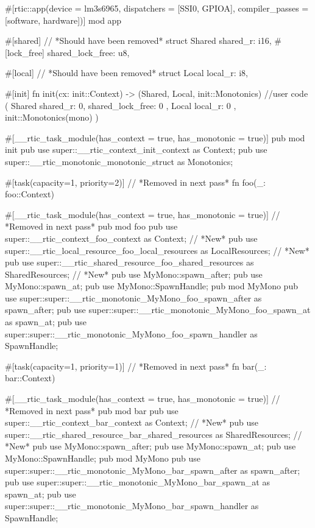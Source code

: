 #[rtic::app(device = lm3s6965, dispatchers = [SSI0, GPIOA], compiler_passes = [software, hardware])]
mod app {
    #[shared] // *Should have been removed*
    struct Shared {
        shared_r: i16,
        #[lock_free]
        shared_lock_free: u8,
    }

    #[local] // *Should have been removed*
    struct Local {
        local_r: i8,
    }

    #[init]
    fn init(cx: init::Context) -> (Shared, Local, init::Monotonics) {
        //user code
        (
            Shared { shared_r: 0, shared_lock_free: 0 }, 
            Local { local_r: 0 }, 
            init::Monotonics(mono)
        )
    }
    
    #[__rtic_task_module(has_context = true, has_monotonic = true)]
    pub mod init {
        pub use super::__rtic_context_init_context as Context;
        pub use super::__rtic_monotonic_monotonic_struct as Monotonics;
    }

    #[task(capacity=1, priority=2)] // *Removed in next pass*
    fn foo(_: foo::Context) {
    }
    
    #[__rtic_task_module(has_context = true, has_monotonic = true)] // *Removed in next pass*
    pub mod foo {
        pub use super::__rtic_context_foo_context as Context; // *New*
        pub use super::__rtic_local_resource_foo_local_resources as LocalResources; // *New*
        pub use super::__rtic_shared_resource_foo_shared_resources as SharedResources; // *New*
        pub use MyMono::spawn_after;
        pub use MyMono::spawn_at;
        pub use MyMono::SpawnHandle;
        pub mod MyMono {
            pub use super::super::__rtic_monotonic_MyMono_foo_spawn_after as spawn_after;
            pub use super::super::__rtic_monotonic_MyMono_foo_spawn_at as spawn_at;
            pub use super::super::__rtic_monotonic_MyMono_foo_spawn_handler as SpawnHandle;
        }
    }

    #[task(capacity=1, priority=1)] // *Removed in next pass*
    fn bar(_: bar::Context) {
    }
    
    #[__rtic_task_module(has_context = true, has_monotonic = true)] // *Removed in next pass*
    pub mod bar {
        pub use super::__rtic_context_bar_context as Context; // *New*
        pub use super::__rtic_shared_resource_bar_shared_resources as SharedResources; // *New*
        pub use MyMono::spawn_after;
        pub use MyMono::spawn_at;
        pub use MyMono::SpawnHandle;
        pub mod MyMono {
            pub use super::super::__rtic_monotonic_MyMono_bar_spawn_after as spawn_after;
            pub use super::super::__rtic_monotonic_MyMono_bar_spawn_at as spawn_at;
            pub use super::super::__rtic_monotonic_MyMono_bar_spawn_handler as SpawnHandle;
        }
    }

}
